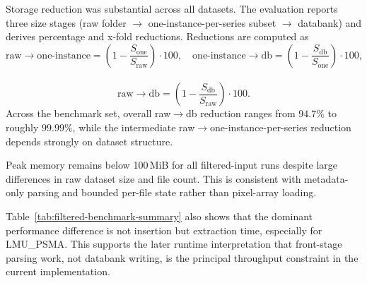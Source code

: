 Storage reduction was substantial across all datasets. The evaluation reports three size stages (raw folder $\rightarrow$ one-instance-per-series subset $\rightarrow$ databank) and derives percentage and x-fold reductions. Reductions are computed as
\[
\text{raw}\rightarrow\text{one-instance}=\left(1-\frac{S_{\text{one}}}{S_{\text{raw}}}\right)\cdot100,\quad
\text{one-instance}\rightarrow\text{db}=\left(1-\frac{S_{\text{db}}}{S_{\text{one}}}\right)\cdot100,\quad
\] \\
\[
\text{raw}\rightarrow\text{db}=\left(1-\frac{S_{\text{db}}}{S_{\text{raw}}}\right)\cdot100.
\]
Across the benchmark set, overall raw$\rightarrow$db reduction ranges from $94.7\%$ to roughly $99.99\%$, while the intermediate raw$\rightarrow$one-instance-per-series reduction depends strongly on dataset structure.

\begin{table}[htbp]
\centering
\caption{Filtered-input benchmark summary: runtime decomposition, peak RSS, and absolute storage sizes.}
\label{tab:filtered-benchmark-summary}
\end{table}

Peak memory remains below 100\,MiB for all filtered-input runs despite large differences in raw dataset size and file count. This is consistent with metadata-only parsing and bounded per-file state rather than pixel-array loading.

Table~\ref{tab:filtered-benchmark-summary} also shows that the dominant performance difference is not insertion but extraction time, especially for LMU\_PSMA. This supports the later runtime interpretation that front-stage parsing work, not databank writing, is the principal throughput constraint in the current implementation.

